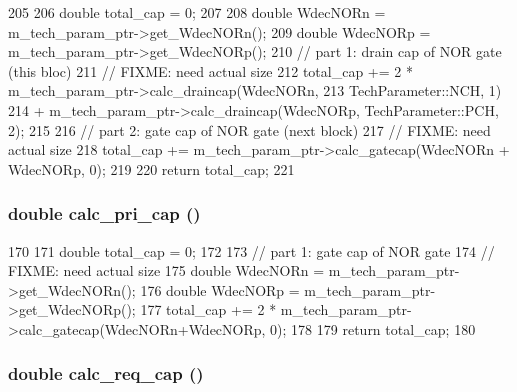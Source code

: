 \begin{DoxyCode}
205 {
206     double total_cap = 0;
207 
208     double WdecNORn = m_tech_param_ptr->get_WdecNORn();
209     double WdecNORp = m_tech_param_ptr->get_WdecNORp();
210     // part 1: drain cap of NOR gate (this bloc)
211     // FIXME: need actual size
212     total_cap += 2 * m_tech_param_ptr->calc_draincap(WdecNORn, 
213                                                      TechParameter::NCH, 1)
214         + m_tech_param_ptr->calc_draincap(WdecNORp, TechParameter::PCH, 2);
215 
216     // part 2: gate cap of NOR gate (next block)
217     // FIXME: need actual size
218     total_cap += m_tech_param_ptr->calc_gatecap(WdecNORn + WdecNORp, 0);
219 
220     return total_cap;
221 }
\end{DoxyCode}
\hypertarget{classMatrixArbiter_ab7379d0e829c19b19c699f8bca018b9d}{
\subsubsection[{calc\_\-pri\_\-cap}]{\setlength{\rightskip}{0pt plus 5cm}double calc\_\-pri\_\-cap ()}}
\label{classMatrixArbiter_ab7379d0e829c19b19c699f8bca018b9d}



\begin{DoxyCode}
170 {
171     double total_cap = 0;
172 
173     // part 1: gate cap of NOR gate
174     // FIXME: need actual size
175     double WdecNORn = m_tech_param_ptr->get_WdecNORn();
176     double WdecNORp = m_tech_param_ptr->get_WdecNORp();
177     total_cap += 2 * m_tech_param_ptr->calc_gatecap(WdecNORn+WdecNORp, 0);
178 
179     return total_cap;
180 }
\end{DoxyCode}
\hypertarget{classMatrixArbiter_ad328bcd6c4435aff24a79afd9ac8b978}{
\subsubsection[{calc\_\-req\_\-cap}]{\setlength{\rightskip}{0pt plus 5cm}double calc\_\-req\_\-cap ()}}
\label{classMatrixArbiter_ad328bcd6c4435aff24a79afd9ac8b978}



